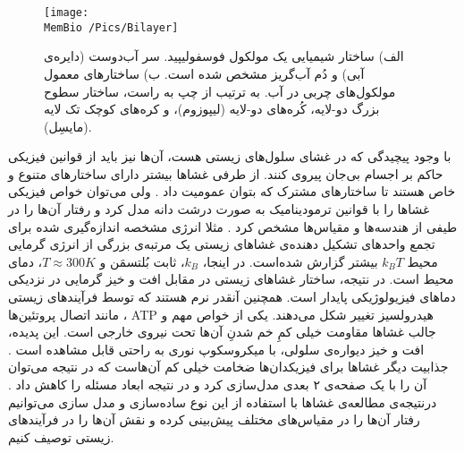 \begin{figure}[t]
\begin{center}
\texttt{[image: \\MemBio /Pics/Bilayer]}
\caption{
الف) ساختار شیمیایی یک مولکول فوسفولیپید. سر آب‌دوست (دایره‌ی آبی) و  دُم آب‌گریز مشخص شده است. ب) ساختار‌های معمول مولکول‌های چربی در آب. به ترتیب از چپ به راست، ساختار سطوح بزرگ دو-لایه، کُره‌های دو-لایه (لیپوزوم)، و کره‌های کوچک تک لایه (مایسِل).
}
\label{fig:bilayer}
\end{center}
\end{figure}











با وجود پیچیدگی‌ که در غشای سلول‌های زیستی هست، آن‌ها نیز باید از قوانین فیزیکی حاکم بر اجسام بی‌جان پیروی کنند. از طرفی غشا‌ها بیشتر دارای ساختارهای متنوع و خاص هستند تا ساختارهای مشترک که بتوان عمومیت داد
\cite{NelsonBook2004}.
ولی می‌توان خواص فیزیکی غشاها را با قوانین ترمودینامیک به صورت درشت دانه مدل کرد و رفتار‌ آن‌ها را در طیفی از هندسه‌ها و مقیاس‌ها مشخص کرد
\cite{Seifert1997}.
 مثلا انرژی مشخصه اندازه‌گیری شده برای تجمع واحد‌های تشکیل‌ دهنده‌ی غشاهای زیستی یک مرتبه‌ی بزرگی از انرژی گرمایی محیط 
$k_BT$
بیشتر گزارش شده‌است. در اینجا، 
$k_B$،
ثابت بُلتسمَن و 
$T\approx300K$،
دمای محیط است. در نتیجه، ساختار غشاهای زیستی در مقابل افت و خیز گرمایی در نزدیکی دماهای فیزیولوژیکی پایدار است. همچنین آنقدر نرم  هستند که توسط فرآیندهای زیستی مانند اتصال پروتئین‌ها
\cite{NelsonBook2004,Seifert1997,Deserno2015}،
ATP
هیدرولسیز
\cite{Boyle2008Biology,Lipowskyb1995ook}
تغییر شکل می‌دهند.
یکی از خواص مهم و جالب غشاها مقاومت خیلی کمِ خم شدنِ آن‌ها تحت نیروی خارجی است. این پدیده، افت و خیز دیواره‌ی سلولی، با میکروسکوپ نوری به راحتی قابل مشاهده است
\cite{NelsonBook2004}.
جذابیت دیگر غشا‌ها برای فیزیکدان‌ها ضخامت خیلی کم آن‌هاست که در نتیجه می‌توان آن را با یک صفحه‌ی ۲ بعدی مدل‌سازی کرد و در نتیجه ابعاد مسئله‌ را کاهش داد
\cite{Seifert1997,Deserno2015}.
درنتیجه‌ی مطالعه‌ی غشاها با استفاده از این نوع ساده‌سازی و مدل سازی می‌توانیم  رفتار آن‌ها را در مقیاس‌های مختلف پیش‌بینی کرده و نقش‌ آن‌ها را در فرآیند‌های زیستی توصیف کنیم.


